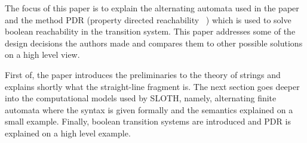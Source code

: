 The focus of this paper is to explain the alternating automata used in the paper and the method PDR (property directed reachability ~\cite{??}) which is used to solve boolean reachability in the transition system. This paper addresses some of the design decisions the authors made and compares them to other possible solutions on a high level view.

First of, the paper introduces the preliminaries to the theory of strings and explains shortly what the straight-line fragment is. The next section goes deeper into the computational models used by SLOTH, namely, alternating finite automata where the syntax is given formally and the semantics explained on a small example. 
Finally, boolean transition systems are introduced and PDR is explained on a high level example.





